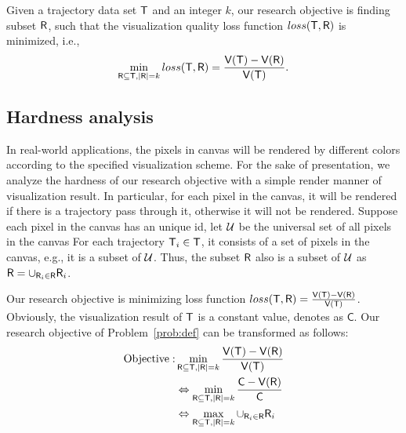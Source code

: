 Given a trajectory data set $\mathsf{T}$ and an integer $k$,  our research objective is finding subset $\mathsf{R}$, such that  the visualization quality loss function $loss(\mathsf{T}, \mathsf{R})$ is minimized,
i.e.,
$$ \min_{\mathsf{R} \subseteq \mathsf{T}, |\mathsf{R}| = k}  loss(\mathsf{T}, \mathsf{R}) =  \frac{\mathsf{V}(\mathsf{T}) - \mathsf{V}(\mathsf{R})}{\mathsf{V}(\mathsf{T})}. $$ %






\subsection{Hardness analysis}
In real-world applications, the pixels in canvas will be rendered by different colors according to the specified visualization scheme.
For the sake of presentation, we analyze the hardness of our research objective with a simple render manner of visualization result.
In particular, for each pixel in the canvas, it will be rendered if there is a trajectory pass through it, otherwise it will not be rendered.
Suppose each pixel in the canvas has an unique id, let $\mathcal{U}$ be the universal set of all pixels in the canvas
For each trajectory $\mathsf{T}_i \in \mathsf{T}$, it consists of a set of pixels in the canvas, e.g., it is a subset of $\mathcal{U}$.
Thus, the subset $\mathsf{R}$ also is a subset of $\mathcal{U}$ as $\mathsf{R} = \cup_{\mathsf{R}_i \in \mathsf{R}} \mathsf{R}_i$.

Our research objective is minimizing loss function $loss(\mathsf{T}, \mathsf{R}) =  \frac{\mathsf{V}(\mathsf{T}) - \mathsf{V}(\mathsf{R})}{\mathsf{V}(\mathsf{T})}$.
Obviously, the visualization result of $\mathsf{T}$ is a constant value, denotes as $\mathsf{C}$.
Our research objective of Problem~\ref{prob:def} can be transformed as follows:
\begin{align}\label{eqn:obj2} \nonumber
\text{Objective}: & \min_{\mathsf{R} \subseteq \mathsf{T}, |\mathsf{R}| = k}  \frac{\mathsf{V}(\mathsf{T}) - \mathsf{V}(\mathsf{R})}{\mathsf{V}(\mathsf{T})} \\ \nonumber
& \Leftrightarrow \min_{\mathsf{R} \subseteq \mathsf{T}, |\mathsf{R}| = k}  \frac{\mathsf{C} - \mathsf{V}(\mathsf{R})}{\mathsf{C}} \\ \nonumber
& \Leftrightarrow \max_{\mathsf{R} \subseteq \mathsf{T}, |\mathsf{R}| = k}  \cup_{\mathsf{R}_i \in \mathsf{R}} \mathsf{R}_i
\end{align}


